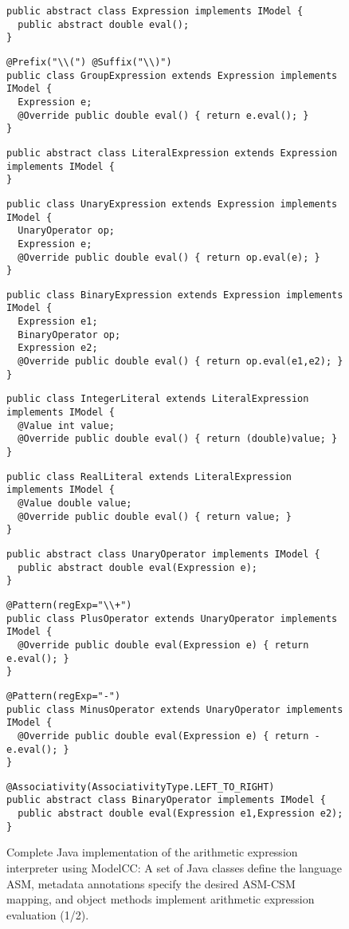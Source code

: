 \documentclass[preprint]{elsarticle}
\newcommand{\sepv}{\vspace{-6.0mm}}
\begin{document}
\begin{figure*}[p!]
\begin{verbatim}
public abstract class Expression implements IModel {
  public abstract double eval();
}
\end{verbatim}
\sepv
\begin{verbatim}
@Prefix("\\(") @Suffix("\\)")
public class GroupExpression extends Expression implements IModel {
  Expression e;
  @Override public double eval() { return e.eval(); }
}
\end{verbatim}
\sepv
\begin{verbatim}
public abstract class LiteralExpression extends Expression implements IModel {
}
\end{verbatim}
\sepv
\begin{verbatim}
public class UnaryExpression extends Expression implements IModel {
  UnaryOperator op;
  Expression e;
  @Override public double eval() { return op.eval(e); }
}
\end{verbatim}
\sepv
\begin{verbatim}
public class BinaryExpression extends Expression implements IModel {
  Expression e1;
  BinaryOperator op;
  Expression e2;
  @Override public double eval() { return op.eval(e1,e2); }
}
\end{verbatim}
\sepv
\begin{verbatim}
public class IntegerLiteral extends LiteralExpression implements IModel {
  @Value int value;
  @Override public double eval() { return (double)value; }
}
\end{verbatim}
\sepv
\begin{verbatim}
public class RealLiteral extends LiteralExpression implements IModel {
  @Value double value;
  @Override public double eval() { return value; }
}
\end{verbatim}
\sepv
\begin{verbatim}
public abstract class UnaryOperator implements IModel {
  public abstract double eval(Expression e);
}
\end{verbatim}
\sepv
\begin{verbatim}
@Pattern(regExp="\\+")
public class PlusOperator extends UnaryOperator implements IModel {
  @Override public double eval(Expression e) { return e.eval(); }
}
\end{verbatim}
\sepv
\begin{verbatim}
@Pattern(regExp="-")
public class MinusOperator extends UnaryOperator implements IModel {
  @Override public double eval(Expression e) { return -e.eval(); }
}
\end{verbatim}
\sepv
\begin{verbatim}
@Associativity(AssociativityType.LEFT_TO_RIGHT)
public abstract class BinaryOperator implements IModel {
  public abstract double eval(Expression e1,Expression e2);
}
\end{verbatim}
\caption{Complete Java implementation of the arithmetic expression interpreter using ModelCC: A set of Java classes define the language ASM,
metadata annotations specify the desired ASM-CSM mapping, and object methods implement arithmetic expression evaluation (1/2).}
\label{fig:calcimmodelcc1}
\end{figure*}
\end{document}
